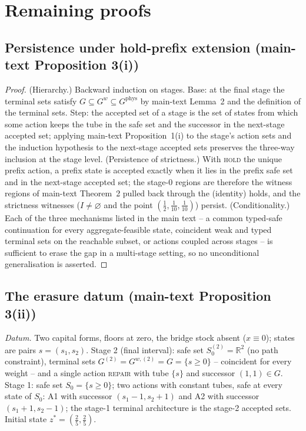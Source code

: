\documentclass[preprint,11pt,authoryear]{elsarticle}
\theoremstyle{remark}
\newcommand{\act}[1]{\textsc{#1}}
\begin{document}
\section{Remaining proofs}\label{si:proofs}

\subsection{Persistence under hold-prefix extension (main-text Proposition 3(i))}

\begin{proof}
(Hierarchy.) Backward induction on stages. Base: at the final stage the terminal sets satisfy $G\subseteq G^w\subseteq G^{\mathrm{phys}}$ by main-text Lemma~2 and the definition of the terminal sets. Step: the accepted set of a stage is the set of states from which some action keeps the tube in the safe set and the successor in the next-stage accepted set; applying main-text Proposition~1(i) to the stage's action sets and the induction hypothesis to the next-stage accepted sets preserves the three-way inclusion at the stage level.
(Persistence of strictness.) With \act{hold} the unique prefix action, a prefix state is accepted exactly when it lies in the prefix safe set and in the next-stage accepted set; the stage-0 regions are therefore the witness regions of main-text Theorem~2 pulled back through the (identity) holds, and the strictness witnesses ($I\neq\varnothing$ and the point $(\tfrac12,\tfrac1{10},\tfrac1{10})$) persist.
(Conditionality.) Each of the three mechanisms listed in the main text -- a common typed-safe continuation for every aggregate-feasible state, coincident weak and typed terminal sets on the reachable subset, or actions coupled across stages -- is sufficient to erase the gap in a multi-stage setting, so no unconditional generalisation is asserted.
\end{proof}

\subsection{The erasure datum (main-text Proposition 3(ii))}\label{si:erasure}

\emph{Datum.} Two capital forms, floors at zero, the bridge stock absent ($x\equiv0$); states are pairs $s=(s_1,s_2)$. Stage 2 (final interval): safe set $S_0^{(2)}=\mathbb R^2$ (no path constraint), terminal sets $G^{(2)}=G^{w,(2)}=G=\{s\ge0\}$ -- coincident for every weight -- and a single action \act{repair} with tube $\{s\}$ and successor $(1,1)\in G$. Stage 1: safe set $S_0=\{s\ge0\}$; two actions with constant tubes, safe at every state of $S_0$: A1 with successor $(s_1-1,s_2+1)$ and A2 with successor $(s_1+1,s_2-1)$; the stage-1 terminal architecture is the stage-2 accepted sets. Initial state $z^*=(\tfrac25,\tfrac25)$.
\end{document}
